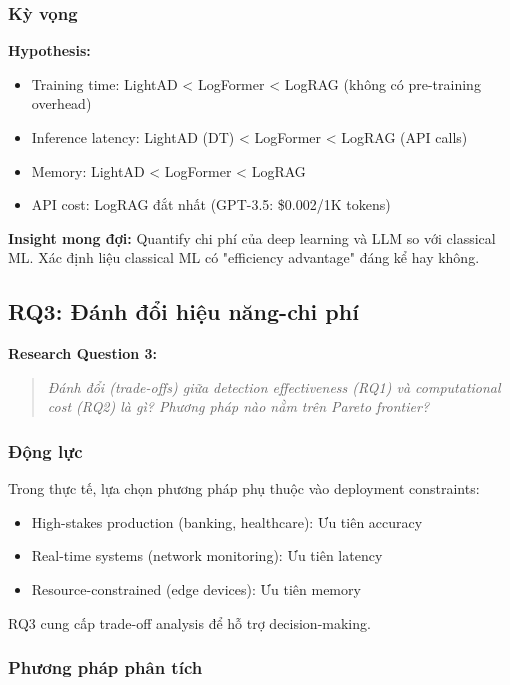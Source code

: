 \subsubsection{Kỳ vọng}

\textbf{Hypothesis:} 
\begin{itemize}
    \item Training time: LightAD < LogFormer < LogRAG (không có pre-training overhead)
    \item Inference latency: LightAD (DT) < LogFormer < LogRAG (API calls)
    \item Memory: LightAD < LogFormer < LogRAG
    \item API cost: LogRAG đắt nhất (GPT-3.5: \$0.002/1K tokens)
\end{itemize}

\textbf{Insight mong đợi:} Quantify chi phí của deep learning và LLM so với classical ML. Xác định liệu classical ML có "efficiency advantage" đáng kể hay không.

\subsection{RQ3: Đánh đổi hiệu năng-chi phí}
\label{subsec:rq3}

\textbf{Research Question 3:}

\begin{quote}
\textit{Đánh đổi (trade-offs) giữa detection effectiveness (RQ1) và computational cost (RQ2) là gì? Phương pháp nào nằm trên Pareto frontier?}
\end{quote}

\subsubsection{Động lực}

Trong thực tế, lựa chọn phương pháp phụ thuộc vào deployment constraints:
\begin{itemize}
    \item High-stakes production (banking, healthcare): Ưu tiên accuracy
    \item Real-time systems (network monitoring): Ưu tiên latency
    \item Resource-constrained (edge devices): Ưu tiên memory
\end{itemize}

RQ3 cung cấp trade-off analysis để hỗ trợ decision-making.

\subsubsection{Phương pháp phân tích}

